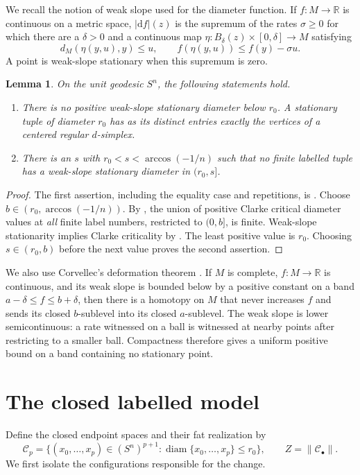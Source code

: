 \documentclass[11pt,a4paper]{article}
\newtheorem{lemma}[theorem]{Lemma}
\theoremstyle{definition}
\DeclareMathOperator{\diam}{diam}
\newcommand{\R}{\mathbb R}
\newcommand{\fat}[1]{\lVert #1\rVert}
\newcommand{\Cconf}{\mathcal C}
\begin{document}
We recall the notion of weak slope used for the diameter function. If \(f:M\to\R\) is continuous on a metric space, \(|\mathrm df|(z)\) is the supremum of the rates \(\sigma\geq0\) for which there are a \(\delta>0\) and a continuous map
\(\eta:B_\delta(z)\times[0,\delta]\to M\) satisfying
\[
d_M(\eta(y,u),y)\leq u,\qquad
f(\eta(y,u))\leq f(y)-\sigma u.
\]
A point is weak-slope stationary when this supremum is zero.

\begin{lemma}\label{lem:spectrum}
On the unit geodesic \(S^n\), the following statements hold.
\begin{enumerate}
\item There is no positive weak-slope stationary diameter below \(r_0\). A stationary tuple of diameter \(r_0\) has as its distinct entries exactly the vertices of a centered regular \(d\)-simplex.
\item There is an \(s\) with \(r_0<s<\arccos(-1/n)\) such that no finite labelled tuple has a weak-slope stationary diameter in \((r_0,s]\).
\end{enumerate}
\end{lemma}
\begin{proof}
The first assertion, including the equality case and repetitions, is \cite[Theorem~4.5]{MW}. Choose
\(b\in(r_0,\arccos(-1/n))\). By \cite[Theorem~5.1]{MW}, the union of positive Clarke critical diameter values at \emph{all} finite label numbers, restricted to \((0,b]\), is finite. Weak-slope stationarity implies Clarke criticality by \cite[Proposition~3.9]{MW}. The least positive value is \(r_0\). Choosing \(s\in(r_0,b)\) before the next value proves the second assertion.
\end{proof}

We also use Corvellec's deformation theorem \cite[Theorem~2.4]{Cor}. If \(M\) is complete, \(f:M\to\R\) is continuous, and its weak slope is bounded below by a positive constant on a band
\(a-\delta\leq f\leq b+\delta\), then there is a homotopy on \(M\) that never increases \(f\) and sends its closed \(b\)-sublevel into its closed \(a\)-sublevel. The weak slope is lower semicontinuous: a rate witnessed on a ball is witnessed at nearby points after restricting to a smaller ball. Compactness therefore gives a uniform positive bound on a band containing no stationary point.

\section{The closed labelled model}
Define the closed endpoint spaces and their fat realization by
\[
\Cconf_p=\{(x_0,\ldots,x_p)\in(S^n)^{p+1}:\diam\{x_0,\ldots,x_p\}\leq r_0\},
\qquad Z=\fat{\Cconf_\bullet}.
\]
We first isolate the configurations responsible for the change.
\end{document}
